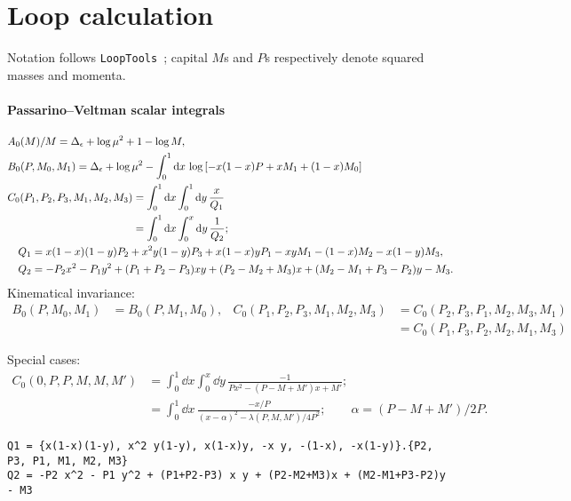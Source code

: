 \documentclass[CheatSheet]{subfiles}
\begin{document}
\summarystyle
\section{Loop calculation}
Notation follows \texttt{LoopTools}~\cite{looptools}; capital $M$s and $P$s respectively denote squared masses and momenta.
\paragraph{Passarino--Veltman scalar integrals}
\begin{align}
& A_0(M)/M = \Delta_\epsilon+\log\mu^2+1-\log M,\\
& B_0(P, M_0, M_1) = \Delta_\epsilon + \log \mu^2 - \int_0^1{\mathrm{d}} x\,\log\left[
    -x(1-x)P+x M_1+(1-x)M_0
\right]\\
& C_0(P_1, P_2, P_3, M_1, M_2, M_3)
= \int_0^1 {\mathrm{d}} x \int_0^1{\mathrm{d}} y\,
  \frac{x}{Q_1}\\
&\phantom{C_0(P_1, P_2, P_3, M_1, M_2, M_3)}
= \int_0^1 {\mathrm{d}} x \int_0^x{\mathrm{d}} y\,
  \frac{1}{Q_2};
\\
&\quad Q_1=x(1-x)(1-y)P_2 + x^2 y(1-y)P_3 + x(1-x)y P_1 - x y M_1 - (1-x) M_2 - x(1-y) M_3,\notag\\
&\quad Q_2=-P_2x^2-P_1y^2+(P_1+P_2-P_3)x y + (P_2-M_2+M_3)x + (M_2-M_1+P_3-P_2)y-M_3.\notag
\end{align}
Kinematical invariance:
\begin{equation}
\begin{split}
 B_0(P, M_0, M_1) &= B_0(P, M_1, M_0),
 &
 C_0(P_1,P_2,P_3,M_1,M_2,M_3) &= C_0(P_2,P_3,P_1,M_2,M_3,M_1)
                        \\&& &= C_0(P_1,P_3,P_2,M_2,M_1,M_3)
\end{split}
\end{equation}

Special cases:
\begin{equation}
\begin{split}
  C_0(0,P,P,M,M,M')
 &= \int_0^1 \dd x \int_0^x\dd y\,
  \frac{-1}{Px^2-(P-M+M')x+M'};
\\ &= \int_0^1 \dd x\,
  \frac{-x/P}{(x-\alpha)^2-\lambda(P,M,M')/4P^2};\qquad \alpha=(P-M+M')/2P.
\end{split}
\end{equation}

\begin{verbatim}
Q1 = {x(1-x)(1-y), x^2 y(1-y), x(1-x)y, -x y, -(1-x), -x(1-y)}.{P2, P3, P1, M1, M2, M3}
Q2 = -P2 x^2 - P1 y^2 + (P1+P2-P3) x y + (P2-M2+M3)x + (M2-M1+P3-P2)y - M3
\end{verbatim}
\end{document}
